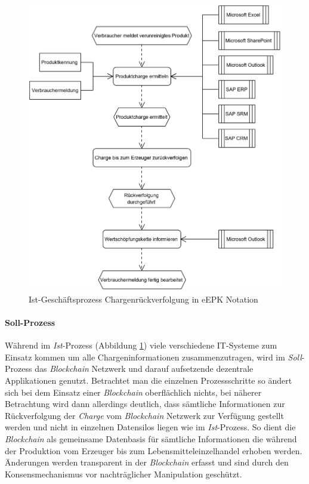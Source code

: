 \begin{figure}[H]
	\centering
	\includegraphics[width=1\linewidth]{pictures/business-process-source-epc-diagram-bw}
	\caption[Ist-Geschäftsprozess Chargenrückverfolgung]{Ist-Geschäftsprozess Chargenrückverfolgung in eEPK Notation}
	\label{fig:business-process-epc-diagramm}
\end{figure}

\paragraph{Soll-Prozess}
Während im \textit{Ist}-Prozess (Abbildung \ref{fig:business-process-epc-diagramm}) viele verschiedene IT-Sys\-teme zum Einsatz kommen um alle Chargeninformationen zusammenzutragen, wird im \textit{Soll}-Prozess das \textit{Blockchain} Netzwerk und darauf aufsetzende dezentrale Applikationen genutzt. Betrachtet man die einzelnen Prozessschritte so ändert sich bei dem Einsatz einer \textit{Blockchain} oberflächlich nichts, bei näherer Betrachtung wird dann allerdings deutlich, dass sämtliche Informationen zur Rückverfolgung der \textit{Charge} vom \textit{Blockchain} Netzwerk zur Verfügung gestellt werden und nicht in einzelnen Datensilos liegen wie im \textit{Ist}-Prozess. So dient die \textit{Blockchain} als gemeinsame Datenbasis für sämtliche Informationen die während der Produktion vom Erzeuger bis zum Lebensmitteleinzelhandel erhoben werden. Änderungen werden transparent in der \textit{Blockchain} erfasst und sind durch den Konsensmechanismus vor nachträglicher Manipulation geschützt. 

